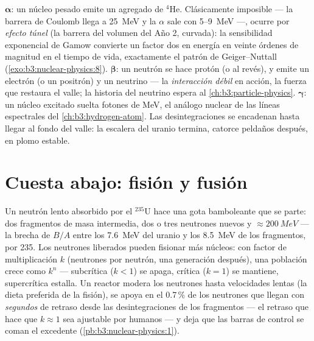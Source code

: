 \begin{remark}\label{rem:b3:nuclear-physics:modes}
$\boldsymbol\alpha$: un núcleo pesado emite un agregado de $^4$He. Clásicamente
imposible --- la barrera de Coulomb llega a \qty{25}{MeV} y la
$\alpha$ sale con \qty{5}{}--\qty{9}{MeV} ---, ocurre por
\emph{efecto túnel} (la barrera del volumen del Año 2, curvada): la
sensibilidad exponencial de Gamow convierte un factor dos en energía en veinte
órdenes de magnitud en el tiempo de vida, exactamente el patrón de
Geiger--Nuttall (\cref{exo:b3:nuclear-physics:8}).
$\boldsymbol\beta$: un neutrón se hace protón (o al revés), y emite
un electrón (o un positrón) y un neutrino --- la \emph{interacción
débil} en acción, la fuerza que restaura el valle; la historia del
neutrino espera al \cref{ch:b3:particle-physics}.
$\boldsymbol\gamma$: un núcleo excitado suelta fotones de \unit{MeV}, el
análogo nuclear de las líneas espectrales del \cref{ch:b3:hydrogen-atom}.
Las desintegraciones se encadenan hasta llegar al fondo del valle: la escalera del uranio
termina, catorce peldaños después, en plomo estable.
\end{remark}

\section{Cuesta abajo: fisión y fusión}

\begin{proposition}\label{prop:b3:nuclear-physics:fission}
Un neutrón lento absorbido por el $^{235}$U hace una gota bamboleante que
se parte: dos fragmentos de masa intermedia, dos o tres neutrones nuevos y
$\approx\qty{200}{MeV}$ --- la brecha de $B/A$ entre los
\qty{7.6}{MeV} del uranio y los \qty{8.5}{MeV} de los fragmentos, por 235.
Los neutrones liberados pueden fisionar más núcleos: con
factor de multiplicación $k$ (neutrones por neutrón, una generación
después), una población crece como $k^n$ --- subcrítica ($k < 1$)
se apaga, crítica ($k = 1$) se mantiene, supercrítica estalla.
Un reactor modera los neutrones hasta velocidades lentas (la dieta preferida de la
fisión), se apoya en el 0.7\,\% de los neutrones que llegan
con \emph{segundos} de retraso desde las desintegraciones de los fragmentos --- el retraso que hace
que $k \approx 1$ sea ajustable por humanos --- y deja que las barras de control se coman
el excedente (\cref{pb:b3:nuclear-physics:1}).
\end{proposition}
\admitted

